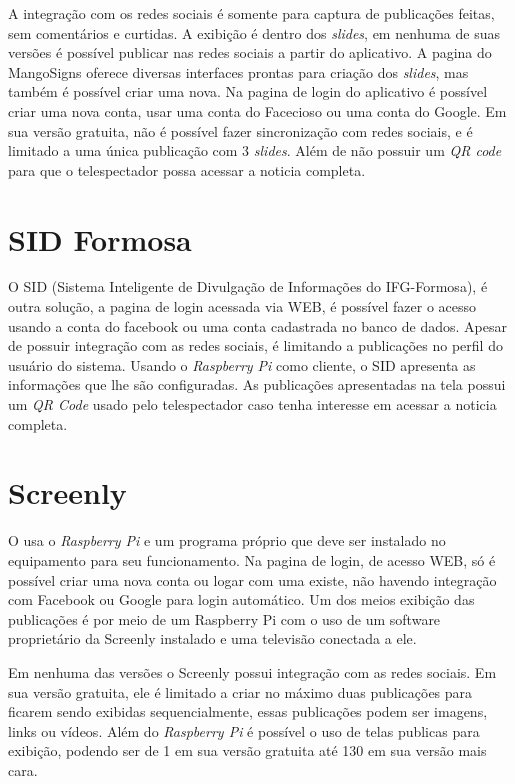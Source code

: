 A integração com os redes sociais é somente para captura de publicações feitas, sem comentários e curtidas. A exibição é dentro dos \textit{slides}, em nenhuma de suas versões é possível publicar nas redes sociais a partir do aplicativo. A pagina do MangoSigns oferece diversas interfaces prontas para criação dos \textit{slides}, mas também é possível criar uma nova. Na pagina de login do aplicativo é possível criar uma nova conta, usar uma conta do Facecioso ou uma conta do Google. Em sua versão gratuita, não é possível fazer sincronização com redes sociais, e é limitado a uma única publicação com 3 \textit{slides}. Além de não possuir um \textit{QR code} para que o telespectador possa acessar a noticia completa.

\section{SID Formosa}
O SID (Sistema Inteligente de Divulgação de Informações do IFG-Formosa), é outra solução, a pagina de login acessada via WEB, é possível fazer o acesso usando a conta do facebook ou uma conta cadastrada no banco de dados. Apesar de possuir integração com as redes sociais, é limitando a publicações no perfil do usuário do sistema. Usando o \textit{Raspberry Pi} como cliente, o SID apresenta as informações que lhe são configuradas. As publicações apresentadas na tela possui um \textit{QR Code} usado pelo telespectador caso tenha interesse em acessar a noticia completa. \cite{sobrinho2017}

\section{Screenly}
O \cite{screenly2017} usa o \textit{Raspberry Pi} e um programa próprio que deve ser instalado no equipamento para seu funcionamento. Na pagina de login, de acesso WEB, só é possível criar uma nova conta ou logar com uma existe, não havendo integração com Facebook ou Google para login automático. Um dos meios exibição das publicações é por meio de um Raspberry Pi com o uso de um software proprietário da Screenly instalado e uma televisão conectada a ele. 

Em nenhuma das versões o Screenly possui integração com as redes sociais. Em sua versão gratuita, ele é limitado a criar no máximo duas publicações para ficarem sendo exibidas sequencialmente, essas publicações podem ser imagens, links ou vídeos. Além do \textit{Raspberry Pi} é possível o uso de telas publicas para exibição, podendo ser de 1 em sua versão gratuita até 130 em sua versão mais cara.

